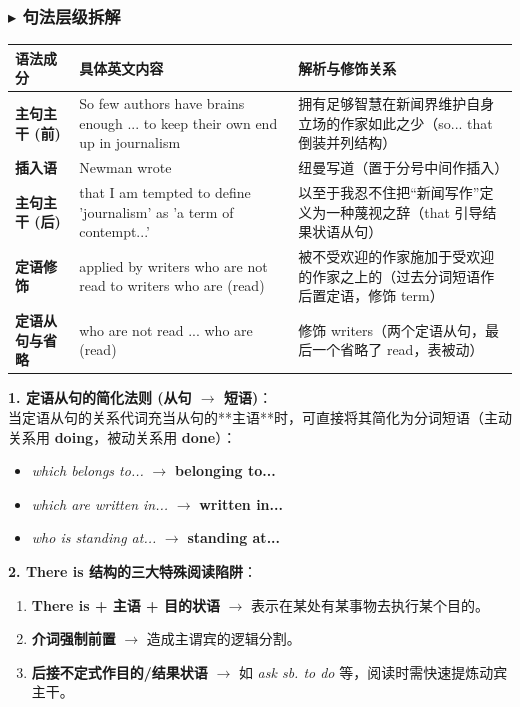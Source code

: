 \documentclass[cn,normal,11pt]{elegantnote}
\begin{document}
\subsubsection*{$\blacktriangleright$ 句法层级拆解}
\noindent
\begin{tabularx}{\textwidth}{p{3.2cm} X X}
  \toprule
  \textbf{语法成分} & \textbf{具体英文内容} & \textbf{解析与修饰关系} \\
  \midrule
  \textbf{主句主干 (前)} & So few authors have brains enough ... to keep their own end up in journalism & 拥有足够智慧在新闻界维护自身立场的作家如此之少（so... that 倒装并列结构） \\
  \midrule
  \textbf{插入语} & Newman wrote & 纽曼写道（置于分号中间作插入） \\
  \midrule
  \textbf{主句主干 (后)} & that I am tempted to define 'journalism' as 'a term of contempt...' & 以至于我忍不住把“新闻写作”定义为一种蔑视之辞（that 引导结果状语从句） \\
  \midrule
  \textbf{定语修饰} & applied by writers who are not read to writers who are (read) & 被不受欢迎的作家施加于受欢迎的作家之上的（过去分词短语作后置定语，修饰 term） \\
  \midrule
  \textbf{定语从句与省略} & who are not read ... who are (read) & 修饰 writers（两个定语从句，最后一个省略了 read，表被动） \\
  \bottomrule
\end{tabularx}

\begin{proposition}
  \textbf{1. 定语从句的简化法则 (从句 $\rightarrow$ 短语)}：\\
  当定语从句的关系代词充当从句的**主语**时，可直接将其简化为分词短语（主动关系用 \textbf{doing}，被动关系用 \textbf{done}）：
  \begin{itemize}
    \item \textit{which belongs to...} $\rightarrow$ \textbf{belonging to...}
    \item \textit{which are written in...} $\rightarrow$ \textbf{written in...}
    \item \textit{who is standing at...} $\rightarrow$ \textbf{standing at...}
  \end{itemize}
  \textbf{2. There is 结构的三大特殊阅读陷阱}：
  \begin{enumerate}
    \item \textbf{There is + 主语 + 目的状语} $\rightarrow$ 表示在某处有某事物去执行某个目的。
    \item \textbf{介词强制前置} $\rightarrow$ 造成主谓宾的逻辑分割。
    \item \textbf{后接不定式作目的/结果状语} $\rightarrow$ 如 \textit{ask sb. to do} 等，阅读时需快速提炼动宾主干。
  \end{enumerate}
\end{proposition}
\end{document}
